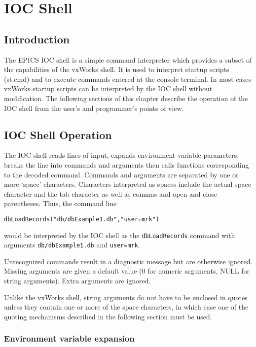 \chapter{IOC Shell}
\label{chap:IOC Shell}

\section{Introduction}

The EPICS IOC shell is a simple command interpreter which provides a subset of the capabilities of the vxWorks shell.
It is used to interpret startup scripts (st.cmd) and to execute commands entered at the console terminal.
In most cases vxWorks startup scripts can be interpreted by the IOC shell without modification.
The following sections of this chapter describe the operation of the IOC shell from the user's and programmer's points of view.

\section{IOC Shell Operation}

The IOC shell reads lines of input, expands environment variable parameters, breaks the line into commands and arguments then calls functions corresponding to the decoded command.
Commands and arguments are separated by one or more `space' characters.
Characters interpreted as spaces include the actual space character and the tab character as well as commas and open and close parentheses.
Thus, the command line

\begin{verbatim}
dbLoadRecords("db/dbExample1.db","user=mrk")
\end{verbatim}

would be interpreted by the IOC shell as the \verb|dbLoadRecords| command with arguments \verb|db/dbExample1.db| and \verb|user=mrk|.

Unrecognized commands result in a diagnostic message but are otherwise ignored.
Missing arguments are given a default value (0 for numeric arguments, NULL for string arguments).
Extra arguments are ignored.

Unlike the vxWorks shell, string arguments do not have to be enclosed in quotes unless they contain one or more of the space characters, in which case one of the quoting mechanisms described in the following section must be used.

\subsection{Environment variable expansion}

